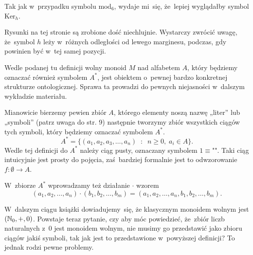 \documentclass[a4paper,11pt]{article}
\begin{document}
\start {} Tak jak w~przypadku symbolu $\textrm{mod}_{ 6 }$,
wydaje mi~się, że~lepiej wyglądałby symbol $\textrm{Ker}_{ h }$.

\vspace{\spaceFour}





\start {} Rysunki na tej stronie są zrobione dość niechlujnie.
Wystarczy zwrócić uwagę, że~symbol $h$ leży w~różnych odległości od
lewego marginesu, podczas, gdy powinien być w~tej samej pozycji.

\vspace{\spaceFour}





\start {} Wedle podanej tu definicji wolny monoid $M$ nad
alfabetem $A$, który będziemy oznaczać również symbolem $A^{ * }$,
jest obiektem o~pewnej bardzo konkretnej strukturze ontologicznej.
Sprawa ta prowadzi do pewnych niejasności w~dalszym wykładzie
materiału.

Mianowicie bierzemy pewien zbiór $A$, którego elementy noszą nazwę
„liter” lub „symboli” (patrz uwaga do str. 9) następnie tworzymy zbiór
wszystkich ciągów tych symboli, który będziemy oznaczać symbolem
$A^{ * }$.
\begin{equation}
  \label{eq:Forys-Forys-02}
  A^{ * } =
  \{ ( a_{ 1 }, a_{ 2 }, a_{ 3 }, \ldots, a_{ n } ) \;\; : \;\; n \geq 0, \;
  a_{ i } \in A \}.
\end{equation}
Wedle tej definicji do $A^{ * }$ należy ciąg pusty, oznaczany symbolem
$1 \equiv \texttt{""}$. Taki ciąg intuicyjnie jest prosty do pojęcia,
zaś~bardziej formalnie jest to odwzorowanie $f : \emptyset \to A$.

W~zbiorze $A^{ * }$ wprowadzamy też działanie $\cdot$ wzorem
\begin{equation}
  \label{eq:Froys-Forys-03}
  ( a_{ 1 }, a_{ 2 }, \ldots, a_{ n } ) \cdot ( b_{ 1 }, b_{ 2 }, \ldots, b_{ m } ) =
  ( a_{ 1 }, a_{ 2 }, \ldots, a_{ n }, b_{ 1 }, b_{ 2 }, \ldots, b_{ m } ).
\end{equation}

W~dalszym ciągu książki dowiadujemy~się, że klasycznym monoidem wolnym
jest $( \mathbb{N}_{ 0 }, +, 0 )$. Powstaje teraz pytanie, czy aby móc
powiedzieć, że~zbiór liczb naturalnych z~$0$ jest monoidem wolnym, nie
musimy go przedstawić jako zbioru ciągów jakiś symboli, tak jak jest
to przedstawione w~powyższej definicji? To jednak rodzi pewne
problemy.
\end{document}
